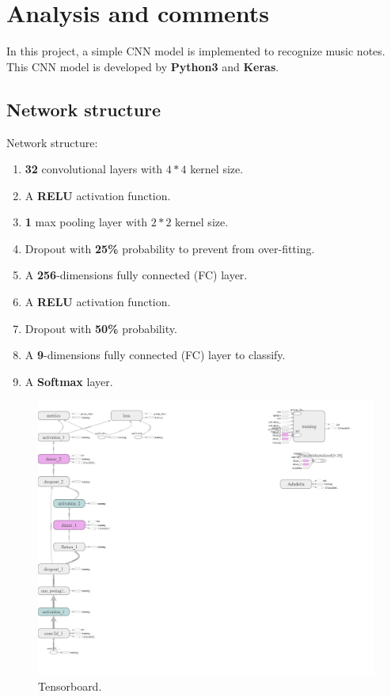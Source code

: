 \chapter{Analysis and comments}
\indent\indent
	In this project, a simple CNN model is implemented to recognize music notes. \\
	This CNN model is developed by \textbf{Python3} and \textbf{Keras}.
	
\section{Network structure}
\indent\indent
	Network structure:
	\begin{enumerate}
		\item \textbf{32} convolutional layers with $4 * 4$ kernel size.
		\item A \textbf{RELU} activation function.
		\item \textbf{1} max pooling layer with $2 * 2$ kernel size.
		\item Dropout with \textbf{25\%} probability to prevent from over-fitting.
		\item A \textbf{256}-dimensions fully connected (FC) layer.
		\item A \textbf{RELU} activation function.
		\item Dropout with \textbf{50\%} probability.
		\item A \textbf{9}-dimensions fully connected (FC) layer to classify.
		\item A \textbf{Softmax} layer.
	\end{enumerate}

	\begin{figure}[H]
		\centering
		\label{anal_1}
		\includegraphics[scale=0.25]{img/sample_tensorboard.png}
		\caption{Tensorboard.}
	\end{figure}

